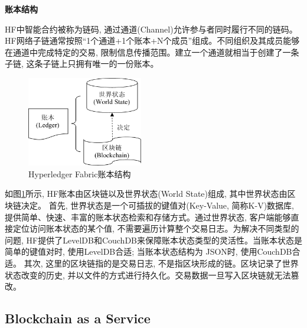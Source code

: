 \textbf{账本结构}

HF中智能合约被称为链码, 通过通道(Channel)允许参与者同时履行不同的链码。HF网络子链通常按照“1个通道+1个账本+N个成员”组成。不同组织及其成员能够在通道中完成特定的交易, 限制信息传播范围。建立一个通道就相当于创建了一条子链, 这条子链上只拥有唯一的一份账本。

\begin{figure}[h] %
    \centering %
    \includegraphics[width=0.45\textwidth]{FIGs/chapter2/ledger.pdf} %
    \caption{Hyperledger Fabric账本结构} %
    \label{fabric_ledger} %
\end{figure}%

如图\ref{fabric_ledger}所示, HF账本由区块链以及世界状态(World State)组成, 其中世界状态由区块链决定。
首先, 世界状态是一个可插拔的键值对(Key-Value, 简称K-V)数据库, 提供简单、快速、丰富的账本状态检索和存储方式。通过世界状态, 客户端能够直接定位访问账本状态的某个值, 不需要遍历计算整个交易日志。为解决不同类型的问题, HF提供了LevelDB和CouchDB来保障账本状态类型的灵活性。当账本状态是简单的键值对时, 使用LevelDB合适; 当账本状态结构为 JSON时, 使用CouchDB合适。
其次, 这里的区块链指的是交易日志, 不是指区块形成的链。区块记录了世界状态改变的历史, 并以文件的方式进行持久化。交易数据一旦写入区块链就无法篡改。

\subsection{Blockchain as a Service}\label{section: BaaS}

